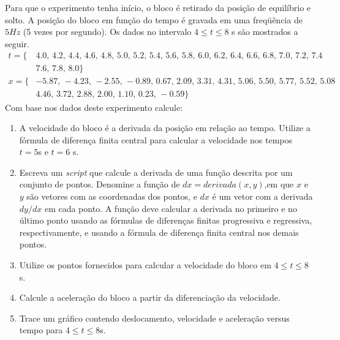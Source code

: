 \begin{enumerate}[label=\thesection.\arabic*]
Para que o experimento tenha início, o bloco é retirado da posição de equilíbrio e solto. 
A posição do bloco em função do tempo é gravada em uma freqüência
de $5 Hz$ (5 vezes por segundo). Os dados no intervalo $4 \le t \le 8$ s são mostrados a seguir.
\[
\begin{aligned}
t = \{&4.0,\, 4.2,\, 4.4,\, 4.6,\, 4.8,\, 5.0,\, 5.2,\, 5.4,\, 5.6,\, 5.8,\,6.0,\, 6.2,\, 6.4,\, 6.6,\, 6.8,\, 7.0,\, 7.2,\, 7.4
\\ & 7.6,\, 7.8,\, 8.0\}\\
x = \{&-5.87,\, -4.23,\, -2.55,\, -0.89,\, 0.67,\, 2.09,\, 3.31,\, 4.31,\, 5.06,\,5.50,\, 5.77,\, 5.52,\, 5.08\\
& 4.46,\, 3.72,\, 2.88,\, 2.00,\, 1.10,\, 0.23,\, -0.59\}
\end{aligned}
\]
Com base nos dados deste experimento calcule:
    \begin{enumerate}
        \item A velocidade do bloco é a derivada da posição em
    relação ao tempo. Utilize a fórmula de diferença finita central para calcular a velocidade nos tempos $t = 5$s e $t = 6$ s.
        \item Escreva um {\it script} que calcule a derivada de uma função descrita por um conjunto de pontos. 
        Denomine a função de $dx=derivada(x,y)$,em que $x$ e $y$ são vetores com as coordenadas dos pontos, e $dx$ é um vetor com a derivada $dy/dx$ em
    cada ponto. A função deve calcular a derivada no primeiro e no último ponto usando as fórmulas de diferenças finitas progressiva e regressiva, respectivamente, 
    e usando a fórmula de diferença finita central nos demais pontos. 
        \item Utilize os pontos fornecidos para calcular a velocidade do bloco em $4 \le t \le 8$s. 
        \item Calcule a aceleração do bloco a partir da diferenciação da velocidade. 
        \item Trace um gráfico contendo deslocamento, velocidade e aceleração versus tempo para $4 \le t \le 8$s.
    \end{enumerate}



\end{enumerate}
